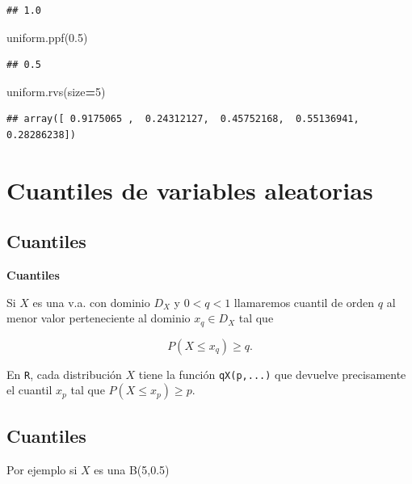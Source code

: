 \documentclass[]{book}
\newenvironment{Shaded}{\begin{snugshade}}{\end{snugshade}}
\newcommand{\DecValTok}[1]{\textcolor[rgb]{0.00,0.00,0.81}{#1}}
\newcommand{\FloatTok}[1]{\textcolor[rgb]{0.00,0.00,0.81}{#1}}
\newcommand{\NormalTok}[1]{#1}
\newcommand{\OperatorTok}[1]{\textcolor[rgb]{0.81,0.36,0.00}{\textbf{#1}}}
\begin{document}
\begin{verbatim}
## 1.0
\end{verbatim}

\begin{Shaded}
\begin{Highlighting}[]
\NormalTok{uniform.ppf(}\FloatTok{0.5}\NormalTok{)}
\end{Highlighting}
\end{Shaded}

\begin{verbatim}
## 0.5
\end{verbatim}

\begin{Shaded}
\begin{Highlighting}[]
\NormalTok{uniform.rvs(size}\OperatorTok{=}\DecValTok{5}\NormalTok{)}
\end{Highlighting}
\end{Shaded}

\begin{verbatim}
## array([ 0.9175065 ,  0.24312127,  0.45752168,  0.55136941,  0.28286238])
\end{verbatim}

\hypertarget{cuantiles-de-variables-aleatorias}{%
\section{Cuantiles de variables aleatorias}\label{cuantiles-de-variables-aleatorias}}

\hypertarget{cuantiles}{%
\subsection{Cuantiles}\label{cuantiles}}

\textbf{Cuantiles}

Si \(X\) es una v.a. con dominio \(D_X\) y \(0<q<1\) llamaremos cuantil de orden \(q\) al menor valor perteneciente al dominio \(x_q\in D_X\) tal que

\[P(X\leq x_q)\geq q.\]

En \texttt{R}, cada distribución \(X\) tiene la función \texttt{qX(p,...)} que devuelve precisamente el cuantil \(x_p\) tal que \(P(X\leq x_p)\geq p.\)

\hypertarget{cuantiles-1}{%
\subsection{Cuantiles}\label{cuantiles-1}}

Por ejemplo si \(X\) es una B(5,0.5)
\end{document}
